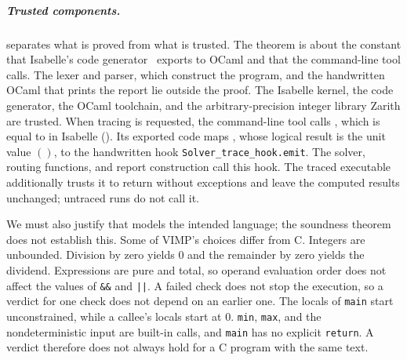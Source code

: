 \subparagraph*{Trusted components.}
 separates what is proved from what is trusted. The theorem is
about the constant that Isabelle's code generator~\cite{haftmann10} exports to
OCaml and that the command-line tool calls. The lexer and parser, which
construct the program, and the handwritten OCaml that prints the report lie
outside the proof. The Isabelle kernel, the code generator, the OCaml
toolchain, and the arbitrary-precision integer library Zarith are trusted.
When tracing is requested, the command-line tool calls
, which is equal to  in
Isabelle (). Its exported code maps
, whose logical result is the unit value $()$, to the
handwritten hook \texttt{Solver\_trace\_hook.emit}. The solver, routing
functions, and report construction call this hook. The traced executable
additionally trusts it to return without exceptions and leave the computed
results unchanged; untraced runs do not call it.

We must also justify that  models the intended language; the
soundness theorem does not establish this. Some of VIMP's choices differ
from C. Integers are unbounded. Division by zero
yields $0$ and the remainder by zero yields the dividend. Expressions are pure and
total, so operand evaluation order does not affect the values of
\texttt{\&\&} and \texttt{||}. A failed check does not stop
the execution, so a verdict for one check does not depend on an earlier one.
The locals of \texttt{main} start unconstrained, while a callee's locals start
at $0$. \texttt{min}, \texttt{max}, and the nondeterministic input are
built-in calls, and \texttt{main} has no explicit \texttt{return}. A verdict therefore does not always hold for a C program with the
same text.


